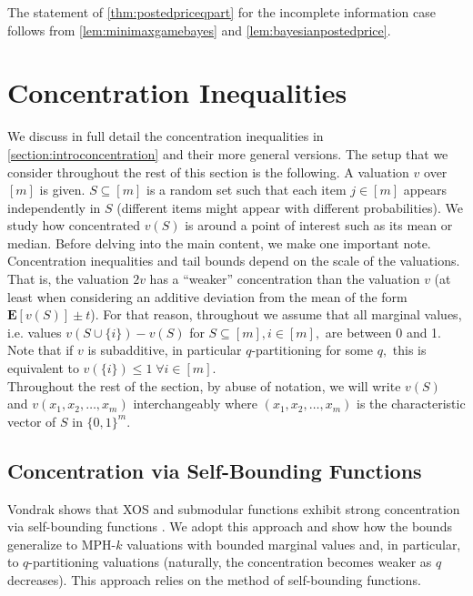 \documentclass[11pt]{article}\usepackage{amsfonts}
\numberwithin{theorem}{subsection}
\newcommand{\expect}{\mathbf{E}}
\begin{document}
\noindent
The statement of 
\cref{thm:postedpriceqpart} for the incomplete information case follows from
\cref{lem:minimaxgamebayes} and\linebreak 
\cref{lem:bayesianpostedprice}.

\section{Concentration Inequalities}
\label{section:concentration}
We discuss in full detail the concentration inequalities in \cref{section:introconcentration} and their more general versions.  The setup that we consider throughout the rest of this section is the following.
A valuation $v$ over $[m]$ is given.
$S\subseteq [m]$ is a random set such that each item $j\in [m]$ appears independently in $S$ (different items might appear with different probabilities). We study how concentrated $v(S)$ is around a point of interest such as its mean or median.  
Before delving into the main content, we make one important note. Concentration inequalities and tail bounds depend on the scale of the valuations. That is, the valuation $2v$ has a ``weaker'' concentration than the valuation $v$ (at least when considering an additive deviation from the mean of the form $\expect[v(S)]\pm t$). For that reason, throughout we assume that all marginal values, i.e. values $v(S\cup\{i\}) - v(S)$ for $S\subseteq [m], i\in [m],$ are between 0 and 1. Note that if $v$ is subadditive, in particular $q$-partitioning for some $q,$ this is equivalent to $v(\{i\})\le 1\; \forall i\in [m]$.\\

\noindent
Throughout the rest of the section, by abuse of notation, we will write $v(S)$ and $v(x_1, x_2, \ldots, x_m)$ interchangeably where $(x_1, x_2, \ldots, x_m)$ is the characteristic vector of $S$ in $\{0,1\}^m.$

\subsection{Concentration via Self-Bounding Functions}
\label{section:selfbounding}
Vondrak shows that XOS and submodular functions exhibit strong concentration via self-bounding functions \cite[Corollary 3.2]{Vondrak10}. We adopt this approach and show how the bounds generalize to MPH-$k$ valuations with bounded marginal values and, in particular, to $q$-partitioning valuations (naturally, the concentration becomes weaker as $q$ decreases). This approach relies on the method of self-bounding functions.
\end{document}
